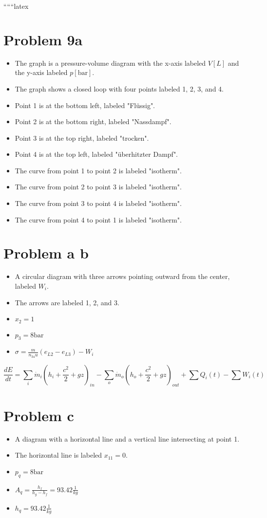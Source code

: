 
``````latex


\section*{Problem 9a}
\begin{itemize}
    \item The graph is a pressure-volume diagram with the x-axis labeled \( V [L] \) and the y-axis labeled \( p [\text{bar}] \).
    \item The graph shows a closed loop with four points labeled 1, 2, 3, and 4.
    \item Point 1 is at the bottom left, labeled "Flüssig".
    \item Point 2 is at the bottom right, labeled "Nassdampf".
    \item Point 3 is at the top right, labeled "trocken".
    \item Point 4 is at the top left, labeled "überhitzter Dampf".
    \item The curve from point 1 to point 2 is labeled "isotherm".
    \item The curve from point 2 to point 3 is labeled "isotherm".
    \item The curve from point 3 to point 4 is labeled "isotherm".
    \item The curve from point 4 to point 1 is labeled "isotherm".
\end{itemize}

\section*{Problem a b}
\begin{itemize}
    \item A circular diagram with three arrows pointing outward from the center, labeled \( W_i \).
    \item The arrows are labeled 1, 2, and 3.
    \item \( x_2 = 1 \)
    \item \( p_3 = 8 \text{bar} \)
    \item \( \sigma = \frac{m}{n_{34}u} (e_{L2} - e_{L3}) - W_i \)
\end{itemize}

\[
\frac{dE}{dt} = \sum_i \dot{m}_i (h_i + \frac{c^2}{2} + gz)_{in} - \sum_o \dot{m}_o (h_o + \frac{c^2}{2} + gz)_{out} + \sum Q_i(t) - \sum W_i(t)
\]

\section*{Problem c}
\begin{itemize}
    \item A diagram with a horizontal line and a vertical line intersecting at point 1.
    \item The horizontal line is labeled \( x_{11} = 0 \).
    \item \( p_{q} = 8 \text{bar} \)
    \item \( A_q = \frac{h_f}{h_g - h_f} = 93.42 \frac{1}{kg} \)
    \item \( h_q = 93.42 \frac{1}{kg} \)
\end{itemize}

